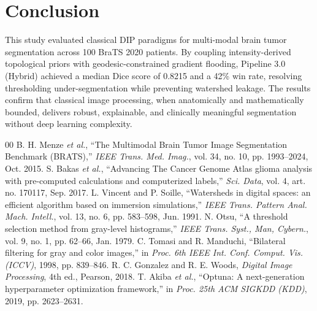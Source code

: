 \documentclass[10pt,conference]{IEEEtran}
\begin{document}
\section{Conclusion}
This study evaluated classical DIP paradigms for multi-modal brain tumor segmentation across 100 BraTS 2020 patients. By coupling intensity-derived topological priors with geodesic-constrained gradient flooding, Pipeline 3.0 (Hybrid) achieved a median Dice score of 0.8215 and a 42\% win rate, resolving thresholding under-segmentation while preventing watershed leakage. The results confirm that classical image processing, when anatomically and mathematically bounded, delivers robust, explainable, and clinically meaningful segmentation without deep learning complexity.

\begin{thebibliography}{00}
 B. H. Menze \textit{et al.}, ``The Multimodal Brain Tumor Image Segmentation Benchmark (BRATS),'' \textit{IEEE Trans. Med. Imag.}, vol. 34, no. 10, pp. 1993--2024, Oct. 2015.
 S. Bakas \textit{et al.}, ``Advancing The Cancer Genome Atlas glioma analysis with pre-computed calculations and computerized labels,'' \textit{Sci. Data}, vol. 4, art. no. 170117, Sep. 2017.
 L. Vincent and P. Soille, ``Watersheds in digital spaces: an efficient algorithm based on immersion simulations,'' \textit{IEEE Trans. Pattern Anal. Mach. Intell.}, vol. 13, no. 6, pp. 583--598, Jun. 1991.
 N. Otsu, ``A threshold selection method from gray-level histograms,'' \textit{IEEE Trans. Syst., Man, Cybern.}, vol. 9, no. 1, pp. 62--66, Jan. 1979.
 C. Tomasi and R. Manduchi, ``Bilateral filtering for gray and color images,'' in \textit{Proc. 6th IEEE Int. Conf. Comput. Vis. (ICCV)}, 1998, pp. 839--846.
 R. C. Gonzalez and R. E. Woods, \textit{Digital Image Processing}, 4th ed., Pearson, 2018.
 T. Akiba \textit{et al.}, ``Optuna: A next-generation hyperparameter optimization framework,'' in \textit{Proc. 25th ACM SIGKDD (KDD)}, 2019, pp. 2623--2631.
\end{thebibliography}
\end{document}
